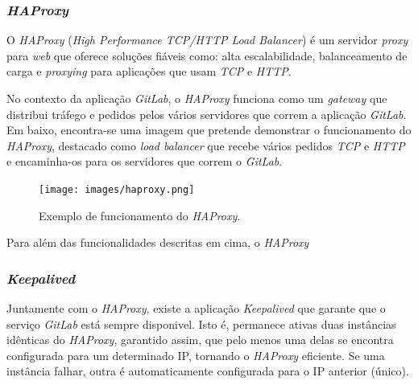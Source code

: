 \documentclass[12pt,a4paper]{article}
\begin{document}
\subsubsection{\emph{HAProxy}}


O \emph{HAProxy} (\emph{High Performance TCP/HTTP Load Balancer}) é um servidor \emph{proxy} para \emph{web} que oferece soluções fiáveis como: alta escalabilidade, balanceamento de carga e \emph{proxying} para aplicações que usam \emph{TCP} e \emph{HTTP}.

No contexto da aplicação \emph{GitLab}, o \emph{HAProxy} funciona como um \emph{gateway} que distribui tráfego e pedidos pelos vários servidores que correm a aplicação \emph{GitLab}. Em baixo, encontra-se uma imagem que pretende demonstrar o funcionamento do \emph{HAProxy}, destacado como \emph{load balancer} que recebe vários pedidos \emph{TCP} e \emph{HTTP} e encaminha-os para os servidores que correm o \emph{GitLab}.

\begin{figure}[H]
  \centering
  \texttt{[image: images/haproxy.png]}
  \caption{Exemplo de funcionamento do \emph{HAProxy}.}
\end{figure}

\newpage
Para além das funcionalidades descritas em cima, o \emph{HAProxy}


\subsubsection{\emph{Keepalived}}

Juntamente com o \emph{HAProxy}, existe a aplicação \emph{Keepalived} que garante que o serviço \emph{GitLab} está sempre disponivel. Isto é, permanece ativas duas instâncias idênticas do \emph{HAProxy}, garantido assim, que pelo menos uma delas se encontra configurada para um determinado IP, tornando o \emph{HAProxy} eficiente. Se uma instância falhar, outra é automaticamente configurada para o IP anterior (único).
\end{document}
